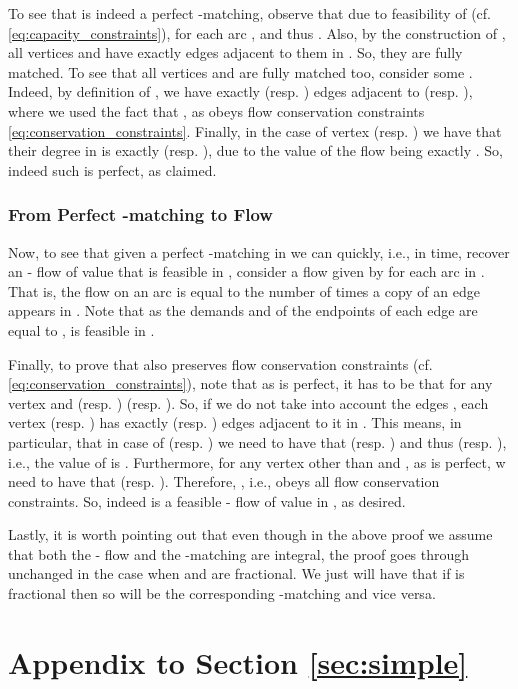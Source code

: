 \documentclass[11pt, letterpaper]{article}
\begin{document}
To see that  is indeed a perfect -matching, observe that due to feasibility of  (cf. \eqref{eq:capacity_constraints}),   for each arc , and thus . Also, by the construction of , all vertices  and  have exactly  edges adjacent to them in . So, they are fully matched. To see that all vertices  and  are fully matched too, consider some . Indeed, by definition of , we have exactly  (resp. ) edges adjacent to  (resp. ), where we used the fact that , as  obeys flow conservation constraints \eqref{eq:conservation_constraints}. Finally, in the case of vertex  (resp. ) we have that their degree in  is exactly  (resp. ), due to the value  of the flow  being exactly . So, indeed such  is perfect, as claimed.

\subsubsection*{From Perfect -matching  to Flow }

Now, to see that given a perfect -matching  in  we can quickly, i.e., in  time, recover an - flow of value  that is feasible in , consider a flow  given by  for each arc  in . That is, the flow  on an arc  is equal to the number of times a copy of an edge  appears in . Note that as the demands  and  of the endpoints of each edge  are equal to ,  is feasible in .

Finally, to prove that  also preserves flow conservation constraints (cf. \eqref{eq:conservation_constraints}), note that as  is perfect, it has to be that for any vertex  and  (resp. )  (resp. ). So, if we do not take into account the edges , each vertex  (resp. ) has exactly  (resp. ) edges adjacent to it in . This means, in particular, that in case of  (resp. ) we need to have that  (resp. ) and thus  (resp. ), i.e., the value of  is . Furthermore, for any vertex  other than  and , as  is perfect,  w need to have that  (resp. ). Therefore, , i.e.,  obeys all flow conservation constraints. So, indeed  is a feasible - flow of value  in , as desired.

Lastly, it is worth pointing out that even though in the above proof we assume that both the - flow  and the -matching  are integral, the proof goes through unchanged in the case when  and  are fractional. We just will have that if  is fractional then so will be the corresponding -matching  and vice versa. 



 \section{Appendix to Section \ref{sec:simple}}\label{app:basic_algorithm}
\end{document}
